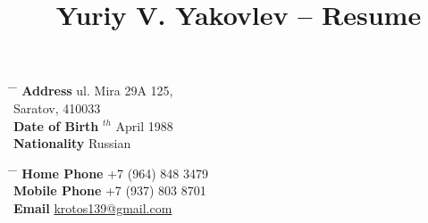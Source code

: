 

\title{Yuriy V. Yakovlev -- Resume} %


\parbox{0.5\textwidth}{ %
\begin{tabbing} %
\hspace{3cm} \= \hspace{4cm} \= \kill %
{\bf Address} \> ul. Mira 29A 125,\\ %
\> Saratov, 410033 \\ %
{\bf Date of Birth} $^{th}$ April 1988 \\ %
{\bf Nationality} \> Russian %
\end{tabbing}}
\hfill %
\parbox{0.5\textwidth}{ %
\begin{tabbing} %
\hspace{3cm} \= \hspace{4cm} \= \kill %
{\bf Home Phone} \> +7 (964) 848 3479 \\ %
{\bf Mobile Phone} \> +7 (937) 803 8701 \\ %
{\bf Email} \> \href{mailto:krotos139@gmail.com}{krotos139@gmail.com} \\ %
\end{tabbing}}


%

